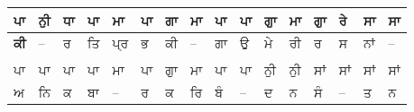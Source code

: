 \documentclass[10pt]{article}
\begin{document}
\begin{table}[!htb]
{\renewcommand{\arraystretch}{1.5}%
\begin{tabular}{llllllllllllllll}
\hline
\multicolumn{1}{|l|}{\textbf{ਪਾ}} & \multicolumn{1}{l|}{ਨੁੀ} & \multicolumn{1}{l|}{ਧਾ}  & \multicolumn{1}{l|}{ਪਾ}   & \multicolumn{1}{l|}{ਮਾ}  & \multicolumn{1}{l|}{ਪਾ}  & \multicolumn{1}{l|}{ਗਾ}  & \multicolumn{1}{l|}{ਮਾ}  & \multicolumn{1}{l|}{\textbf{ਪਾ}} & \multicolumn{1}{l|}{ਪਾ}  & \multicolumn{1}{l|}{ਗੁਾ} & \multicolumn{1}{l|}{ਮਾ}  & \multicolumn{1}{l|}{ਗੁਾ} & \multicolumn{1}{l|}{ਰੇ}  & \multicolumn{1}{l|}{ਸਾ}  & \multicolumn{1}{l|}{ਸਾ}  \\ \hline
\multicolumn{1}{|l|}{\textbf{ਕੀ}} & \multicolumn{1}{l|}{--}  & \multicolumn{1}{l|}{ਰ}   & \multicolumn{1}{l|}{ਤਿ}   & \multicolumn{1}{l|}{ਪ੍ਰ} & \multicolumn{1}{l|}{ਭ}   & \multicolumn{1}{l|}{ਕੀ}  & \multicolumn{1}{l|}{--}  & \multicolumn{1}{l|}{ਗਾ}          & \multicolumn{1}{l|}{ਉ}   & \multicolumn{1}{l|}{ਮੇ}  & \multicolumn{1}{l|}{ਰੀ}  & \multicolumn{1}{l|}{ਰ}   & \multicolumn{1}{l|}{ਸ}   & \multicolumn{1}{l|}{ਨਾਂ} & \multicolumn{1}{l|}{--}  \\ \hline
\multicolumn{16}{l}{}                                                                                                                                                                                                                                                                                                                                                                                                                                           \\ \hline
\multicolumn{1}{|l|}{ਪਾ}          & \multicolumn{1}{l|}{ਪਾ}  & \multicolumn{1}{l|}{ਪਾ}  & \multicolumn{1}{l|}{ਪਾ}   & \multicolumn{1}{l|}{ਮਾ}  & \multicolumn{1}{l|}{ਪਾ}  & \multicolumn{1}{l|}{ਗੁਾ} & \multicolumn{1}{l|}{ਮਾ}  & \multicolumn{1}{l|}{ਪਾ}          & \multicolumn{1}{l|}{ਪਾ}  & \multicolumn{1}{l|}{ਨੁੀ} & \multicolumn{1}{l|}{ਨੁੀ} & \multicolumn{1}{l|}{ਸਾਂ} & \multicolumn{1}{l|}{ਸਾਂ} & \multicolumn{1}{l|}{ਸਾਂ} & \multicolumn{1}{l|}{ਸਾਂ} \\ \hline
\multicolumn{1}{|l|}{ਅ}           & \multicolumn{1}{l|}{ਨਿ}  & \multicolumn{1}{l|}{ਕ}   & \multicolumn{1}{l|}{ਬਾ}   & \multicolumn{1}{l|}{--}  & \multicolumn{1}{l|}{ਰ}   & \multicolumn{1}{l|}{ਕ}   & \multicolumn{1}{l|}{ਰਿ}  & \multicolumn{1}{l|}{ਬੰ}          & \multicolumn{1}{l|}{--}  & \multicolumn{1}{l|}{ਦ}   & \multicolumn{1}{l|}{ਨ}   & \multicolumn{1}{l|}{ਸੰ}  & \multicolumn{1}{l|}{--}  & \multicolumn{1}{l|}{ਤ}   & \multicolumn{1}{l|}{ਨ}   \\ \hline

\end{tabular}}
\end{table}
\end{document}
